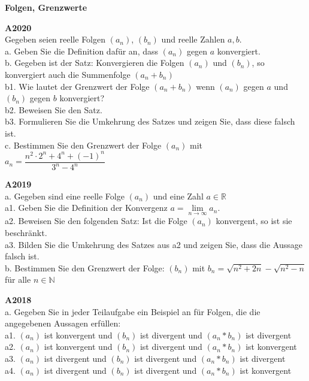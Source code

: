 \documentclass[landscape,twocolumn,a4paper]{article}
\begin{document}
\parindent 0mm


\textbf{Folgen, Grenzwerte}


\bigskip 

\textbf{A2020} \\
Gegeben seien reelle Folgen $(a_n)$, $(b_n)$ und reelle Zahlen $a, b$.\\
a. Geben Sie die Definition dafür an, dass $(a_n)$ gegen $a$ konvergiert. \\
b. Gegeben ist der Satz: Konvergieren die Folgen  $(a_n)$ und  $(b_n)$, so konvergiert
auch die Summenfolge $(a_n + b_n)$ \\
b1. Wie lautet der Grenzwert der Folge $(a_n + b_n)$ wenn  $(a_n)$ gegen $a$ und $(b_n)$ gegen $b$
konvergiert? \\
b2. Beweisen Sie den Satz. \\
b3. Formulieren Sie die Umkehrung des Satzes und zeigen Sie, dass diese falsch ist. \\
c. Bestimmen Sie den Grenzwert der Folge $(a_n)$  mit \\
$a_n = \dfrac{n^2 \cdot 2^n + 4^n + (-1)^n}{3^n - 4^n}$
 
\bigskip 

\textbf{A2019} \\
a. Gegeben sind eine reelle Folge $(a_n)$ und eine Zahl $a \in \mathbb{R}$ \\
a1. Geben Sie die Definition der Konvergenz $a = \lim \limits_{n \to \infty} a_n$. \\
a2. Beweisen Sie den folgenden Satz: Ist die Folge $(a_n)$ konvergent, so ist sie beschränkt. \\
a3. Bilden Sie die Umkehrung des Satzes aus a2 und zeigen Sie, dass die Aussage falsch ist. \\
b. Bestimmen Sie den Grenzwert der Folge: $(b_n)$ mit $b_n = \sqrt{n^2+2n} - \sqrt{n^2-n}$ für alle $n \in
\mathbb{N}$
\bigskip 

\textbf{A2018} \\
a. Gegeben Sie in jeder Teilaufgabe ein Beispiel an für Folgen, die die angegebenen Aussagen erfüllen: \\
a1. $(a_n)$ ist konvergent und $(b_n)$ ist divergent und $(a_n * b_n)$ ist divergent \\
a2. $(a_n)$ ist konvergent und $(b_n)$ ist divergent und $(a_n * b_n)$ ist konvergent \\
a3. $(a_n)$ ist divergent und $(b_n)$ ist divergent und $(a_n * b_n)$ ist divergent \\
a4. $(a_n)$ ist divergent und $(b_n)$ ist divergent und $(a_n * b_n)$ ist konvergent \\
\end{document}
